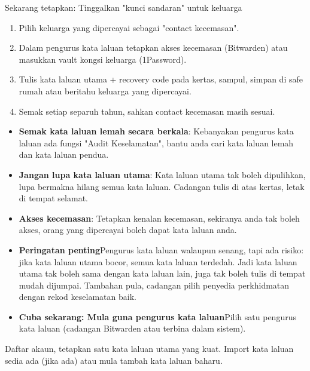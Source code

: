 \begin{tcbpractice}{Sekarang tetapkan: Tinggalkan "kunci sandaran" untuk keluarga}
\begin{enumerate}
  \item Pilih keluarga yang dipercayai sebagai "contact kecemasan".
  \item Dalam pengurus kata laluan tetapkan akses kecemasan (Bitwarden) atau masukkan vault kongsi keluarga (1Password).
  \item Tulis kata laluan utama + recovery code pada kertas, sampul, simpan di safe rumah atau beritahu keluarga yang dipercayai.
  \item Semak setiap separuh tahun, sahkan contact kecemasan masih sesuai.
\end{enumerate}

\end{tcbpractice}


\begin{itemize}
  \item \textbf{Semak kata laluan lemah secara berkala}: Kebanyakan pengurus kata laluan ada fungsi "Audit Keselamatan", bantu anda cari kata laluan lemah dan kata laluan pendua.
  \item \textbf{Jangan lupa kata laluan utama}: Kata laluan utama tak boleh dipulihkan, lupa bermakna hilang semua kata laluan. Cadangan tulis di atas kertas, letak di tempat selamat.
  \item \textbf{Akses kecemasan}: Tetapkan kenalan kecemasan, sekiranya anda tak boleh akses, orang yang dipercayai boleh dapat kata laluan anda.
  \item \textbf{Peringatan penting}Pengurus kata laluan walaupun senang, tapi ada risiko: jika kata laluan utama bocor, semua kata laluan terdedah. Jadi kata laluan utama tak boleh sama dengan kata laluan lain, juga tak boleh tulis di tempat mudah dijumpai. Tambahan pula, cadangan pilih penyedia perkhidmatan dengan rekod keselamatan baik.
  \item \textbf{Cuba sekarang: Mula guna pengurus kata laluan}Pilih satu pengurus kata laluan (cadangan Bitwarden atau terbina dalam sistem).
\end{itemize}

\begin{tcbwarn}{Daftar akaun, tetapkan satu kata laluan utama yang kuat.}
Import kata laluan sedia ada (jika ada) atau mula tambah kata laluan baharu.

\end{tcbwarn}

